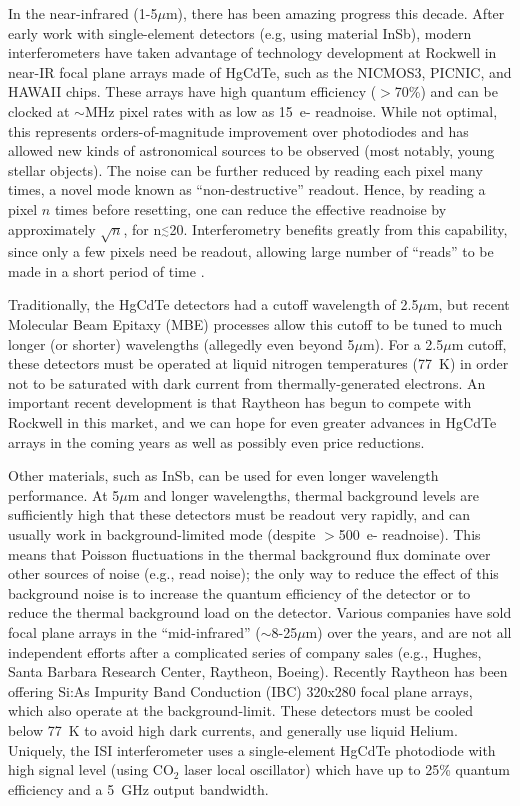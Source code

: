 \documentclass[12pt]{article}
\newcommand{\simle}{\mbox{$\stackrel{<}{_{\sim}}$}}
\begin{document}
In the near-infrared (1-5$\mu$m), there has been amazing progress this
decade.  After early work with single-element detectors (e.g, using
material InSb), modern interferometers have taken advantage of
technology development at Rockwell in near-IR focal plane arrays made
of HgCdTe, such as the NICMOS3, PICNIC, and HAWAII chips.  These
arrays have high quantum efficiency ($>$70\%) and can be clocked at
$\sim$MHz pixel rates with as low as 15~e- readnoise.  While not
optimal, this represents orders-of-magnitude improvement over
photodiodes and has allowed new kinds of astronomical sources to be
observed (most notably, young stellar objects).  The noise can be
further reduced by reading each pixel many times, a novel mode known as
``non-destructive'' readout.  Hence, by reading a pixel $n$ times
before resetting, one can reduce the effective readnoise by
approximately $\sqrt{n}$, for n$\simle$20.  Interferometry benefits
greatly from this capability, since only a few pixels need be readout,
allowing large number of ``reads'' to be made in a short period of
time \citep[interferometry reference][]{rmg1999b}.

Traditionally, the HgCdTe detectors had a cutoff wavelength of
2.5$\mu$m, but recent Molecular Beam Epitaxy (MBE) processes allow
this cutoff to be tuned to much longer (or shorter) wavelengths
(allegedly even beyond 5$\mu$m).  For a 2.5$\mu$m cutoff, these
detectors must be operated at liquid nitrogen temperatures (77~K) in
order not to be saturated with dark current from thermally-generated
electrons.  An important recent development is that Raytheon has begun
to compete with Rockwell in this market, and we can hope for even
greater advances in HgCdTe arrays in the coming years as well as
possibly even price reductions.

Other materials, such as InSb, can be used for even longer wavelength
performance.  At 5$\mu$m and longer wavelengths, thermal background
levels are sufficiently high that these detectors must be readout very
rapidly, and can usually work in background-limited mode (despite
$>$500~e- readnoise).  This means that Poisson fluctuations in the
thermal background flux dominate over other sources of noise (e.g.,
read noise); the only way to reduce the effect of this background
noise is to increase the quantum efficiency of the detector or to
reduce the thermal background load on the detector.  Various companies
have sold focal plane arrays in the ``mid-infrared''
($\sim$8-25$\mu$m) over the years, and are not all independent efforts
after a complicated series of company sales (e.g., Hughes, Santa
Barbara Research Center, Raytheon, Boeing).  Recently Raytheon
has been offering Si:As Impurity Band Conduction (IBC) 320x280 focal
plane arrays, which also operate at the background-limit.  These
detectors must be cooled below 77~K to avoid high dark currents, and
generally use liquid Helium.  Uniquely, the ISI interferometer uses a
single-element HgCdTe photodiode with high signal level (using CO$_2$
laser local oscillator) which have up to 25\% quantum efficiency and a
5~GHz output bandwidth.
\end{document}

